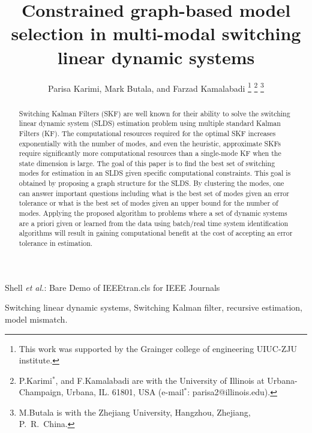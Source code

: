 \documentclass[journal]{IEEEtran}
\begin{document}
\title{Constrained graph-based model selection in multi-modal switching linear dynamic systems}


\author{Parisa Karimi, Mark Butala, and Farzad Kamalabadi
\thanks{This work was supported by the Grainger college of engineering UIUC-ZJU institute.}
\thanks{P.Karimi$^*$, and F.Kamalabadi are with the University of Illinois at Urbana-Champaign, Urbana, IL. 61801, USA (e-mail$^*$: parisa2@illinois.edu).}
\thanks{M.Butala is with the Zhejiang University, Hangzhou, Zhejiang, P.\ R.\ China.}}

{Shell \MakeLowercase{\textit{et al.}}: Bare Demo of IEEEtran.cls for IEEE Journals}
\maketitle
\begin{abstract}
Switching Kalman Filters (SKF) are well known for their ability to solve the switching linear dynamic system (SLDS) estimation problem using multiple standard Kalman Filters (KF). The computational resources required for the optimal SKF increases exponentially with the number of modes, and even the heuristic, approximate SKFs require significantly more computational resources than a single-mode KF when the state dimension is large. The goal of this paper is to find the best set of switching modes for estimation in an SLDS given specific computational constraints. This goal is obtained by proposing a graph structure for the SLDS. By clustering the modes, one can answer important questions including what is the best set of modes given an error tolerance or what is the best set of modes given an upper bound for the number of modes. Applying the proposed algorithm to problems where a set of dynamic systems are a priori given or learned from the data using batch/real time system identification algorithms will result in gaining computational benefit at the cost of accepting an error tolerance in estimation.
\end{abstract}
\begin{IEEEkeywords}
Switching linear dynamic systems, Switching Kalman filter, recursive estimation, model mismatch.
\end{IEEEkeywords}
\IEEEpeerreviewmaketitle
\end{document}
